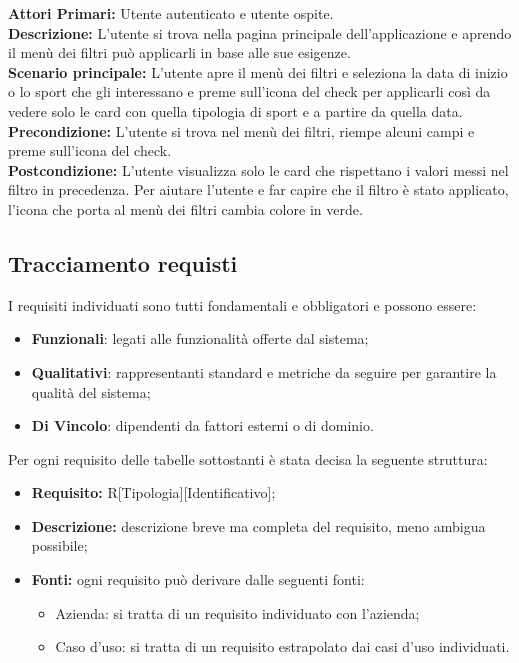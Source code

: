\textbf{Attori Primari:} Utente autenticato e utente ospite.\\
\textbf{Descrizione:} L'utente si trova nella pagina principale dell'applicazione e aprendo il menù dei filtri può applicarli in base alle sue esigenze.\\
\textbf{Scenario principale:} L'utente apre il menù dei filtri e seleziona la data di inizio o lo sport che gli interessano e preme sull'icona del check per applicarli così da vedere solo le card con quella tipologia di sport e a partire da quella data.\\
\textbf{Precondizione:} L'utente si trova nel menù dei filtri, riempe alcuni campi e preme sull'icona del check.\\
\textbf{Postcondizione:} L'utente visualizza solo le card che rispettano i valori messi nel filtro in precedenza. Per aiutare l'utente e far capire che il filtro è stato applicato, l'icona che porta al menù dei filtri cambia colore in verde.\\

\newpage

\subsection{Tracciamento requisti}
I requisiti individuati sono tutti fondamentali e obbligatori e possono essere:
\begin{itemize}
	\item \textbf{Funzionali}: legati alle funzionalità offerte dal sistema;
	\item \textbf{Qualitativi}: rappresentanti standard e metriche da seguire per garantire la qualità del sistema;
	\item \textbf{Di Vincolo}: dipendenti da fattori esterni o di dominio.
\end{itemize}
Per ogni requisito delle tabelle sottostanti è stata decisa la seguente struttura: 
\begin{itemize}
	\item\textbf{Requisito:} R[Tipologia][Identificativo];
	\item\textbf{Descrizione:} descrizione breve ma completa del requisito, meno ambigua possibile;
	\item\textbf{Fonti:} ogni requisito può derivare dalle seguenti fonti:
	\begin{itemize}
		\item Azienda: si tratta di un requisito individuato con l'azienda;
		\item Caso d'uso: si tratta di un requisito estrapolato dai casi d'uso individuati.
	\end{itemize}
\end{itemize}


